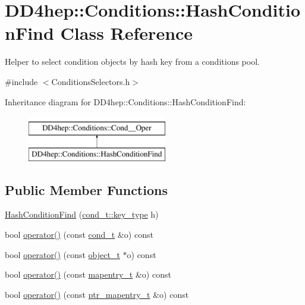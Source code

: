 \hypertarget{class_d_d4hep_1_1_conditions_1_1_hash_condition_find}{}\section{D\+D4hep\+:\+:Conditions\+:\+:Hash\+Condition\+Find Class Reference}
\label{class_d_d4hep_1_1_conditions_1_1_hash_condition_find}


Helper to select condition objects by hash key from a conditions pool.  




{\ttfamily \#include $<$Conditions\+Selectors.\+h$>$}

Inheritance diagram for D\+D4hep\+:\+:Conditions\+:\+:Hash\+Condition\+Find\+:\begin{figure}[H]
\begin{center}
\leavevmode
\includegraphics[height=2.000000cm]{class_d_d4hep_1_1_conditions_1_1_hash_condition_find}
\end{center}
\end{figure}
\subsection*{Public Member Functions}
\begin{DoxyCompactItemize}
\item 
\hyperlink{class_d_d4hep_1_1_conditions_1_1_hash_condition_find_a3fd89cf5e4783fb24a05436db39274ff}{Hash\+Condition\+Find} (\hyperlink{class_d_d4hep_1_1_conditions_1_1_condition_a7528efa762e8cc072ef80ea67c3531f9}{cond\+\_\+t\+::key\+\_\+type} h)
\item 
bool \hyperlink{class_d_d4hep_1_1_conditions_1_1_hash_condition_find_adc62f8efc6338509d172157cdf2f5fe5}{operator()} (const \hyperlink{class_d_d4hep_1_1_conditions_1_1_cond_____oper_aceca9f6a0e8c84364946eace47275d09}{cond\+\_\+t} \&o) const
\item 
bool \hyperlink{class_d_d4hep_1_1_conditions_1_1_hash_condition_find_a6f32ec69f21269d46e522051f1b3b286}{operator()} (const \hyperlink{class_d_d4hep_1_1_conditions_1_1_cond_____oper_a4229491e49bfd21058dff10125a73f63}{object\+\_\+t} $\ast$o) const
\item 
bool \hyperlink{class_d_d4hep_1_1_conditions_1_1_hash_condition_find_a4763328de3dede77bec28bf0ae53e154}{operator()} (const \hyperlink{class_d_d4hep_1_1_conditions_1_1_cond_____oper_a877dac3da66795207aed15be219acbdc}{mapentry\+\_\+t} \&o) const
\item 
bool \hyperlink{class_d_d4hep_1_1_conditions_1_1_hash_condition_find_a78827e11173392b09db7a32fe13ef951}{operator()} (const \hyperlink{class_d_d4hep_1_1_conditions_1_1_cond_____oper_a0949e4bd5f90cd3fae2394cf30983973}{ptr\+\_\+mapentry\+\_\+t} \&o) const
\end{DoxyCompactItemize}
